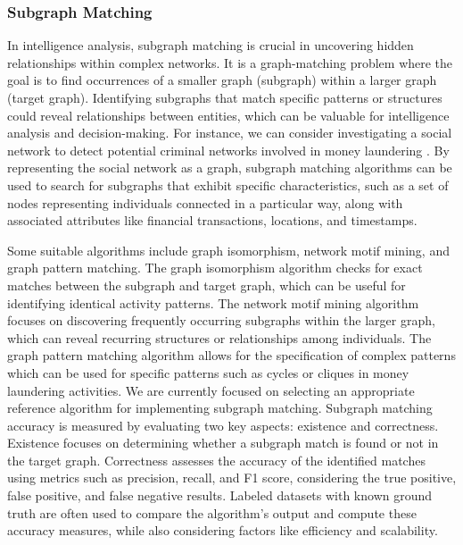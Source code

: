 \documentclass[letterpaper, 10pt]{article}
\begin{document}
\begin{multicols}{2}
{{        \subsubsection{Subgraph Matching}\label{section:subgraphMatching}
            In intelligence analysis, subgraph matching is crucial in uncovering hidden relationships within complex networks. 
            It is a graph-matching problem where the goal is to find occurrences of a smaller graph (subgraph) within a larger graph (target graph). 
            Identifying subgraphs that match specific patterns or structures could reveal relationships between entities, which can be valuable for intelligence analysis and decision-making. 
            For instance, we can consider investigating a social network to detect potential criminal networks involved in money laundering \cite{Soltani2016}. 
            By representing the social network as a graph, subgraph matching algorithms can be used to search for subgraphs that exhibit specific characteristics, such as a set of nodes representing individuals connected in a particular way, along with associated attributes like financial transactions, locations, and timestamps. 
            
            \par{Some suitable algorithms include graph isomorphism, network motif mining, and graph pattern matching. 
            The graph isomorphism algorithm \cite{Babai2016} checks for exact matches between the subgraph and target graph, which can be useful for identifying identical activity patterns. 
            The network motif mining algorithm \cite{Oliver2022}focuses on discovering frequently occurring subgraphs within the larger graph, which can reveal recurring structures or relationships among individuals. 
            The graph pattern matching algorithm \cite{Cheng2008} allows for the specification of complex patterns which can be used for specific patterns such as cycles or cliques in money laundering activities. 
            We are currently focused on selecting an appropriate reference algorithm for implementing subgraph matching. Subgraph matching accuracy is measured by evaluating two key aspects: existence and correctness. Existence focuses on determining whether a subgraph match is found or not in the target graph. Correctness assesses the accuracy of the identified matches using metrics such as precision, recall, and F1 score, considering the true positive, false positive, and false negative results. Labeled datasets with known ground truth are often used to compare the algorithm's output and compute these accuracy measures, while also considering factors like efficiency and scalability.} 
            
}}
\end{multicols}
\end{document}
